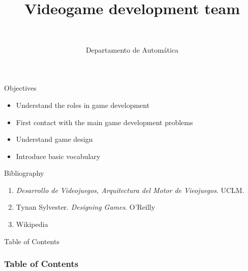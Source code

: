 \documentclass[10pt,compress]{beamer} %
\title[Videogame development team]{Videogame development team}
\author{\asignatura\\\carrera}
\institute{}
\date{Departamento de Automática}
\begin{document}
{\titlepageBlue
    \begin{frame}
        \titlepage
    \end{frame}
}

\institute{\asignatura}

\begin{frame}[plain]{}
   \begin{block}{Objectives}
   \begin{itemize}
        \item Understand the roles in game development
        \item First contact with the main game development problems
        \item Understand game design
		\item Introduce basic vocabulary
	\end{itemize}
	\end{block}

   \begin{block}{Bibliography}
      \begin{enumerate}
          \item  \textit{Desarrollo de Videojuegos, Arquitectura del Motor de Vieojuegos}. UCLM.
          \item Tynan Sylvester. \textit{Designing Games}. O'Reilly
          \item Wikipedia
      \end{enumerate} 
   \end{block}
\end{frame}

{
\begin{frame}[shrink]{Table of Contents}
 \frametitle{Table of Contents}
 \tableofcontents
\end{frame}
}
\end{document}

